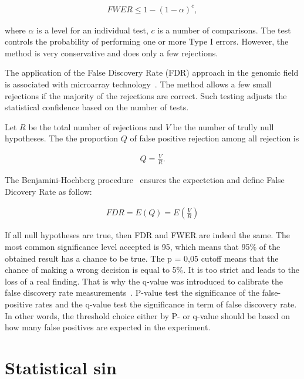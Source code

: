 \begin{align*}
    FWER \leq 1 - (1 - \alpha)^c, 
\end{align*}

where $\alpha$ is a level for an individual test, $c$ is a number of comparisons.
The test controls the probability of performing one or more Type I errors. 
However, the method is very conservative and does only a few rejections. 

The application of the False Discovery Rate (FDR) approach in the genomic field is associated with microarray technology~\cite{lai2017statistical}.
The method allows a few small rejections if the majority of the rejections are correct. Such testing adjusts the statistical confidence based on the number of tests. 

Let $R$ be the total number of rejections and $V$ be the number of trully null hypotheses.
The the proportion $Q$ of false positive rejection among all rejection is 

\begin{align*}
    Q = \frac{V}{R}.
\end{align*}

The Benjamini-Hochberg procedure~\cite{benjamini2000adaptive} ensures the expectetion and define False Dicovery Rate as follow: 

\begin{align*}
    FDR = E(Q) = E \left(\frac{V}{R}\right)
\end{align*}

If all null hypotheses are true, then FDR and FWER are indeed the same.
The most common significance level accepted is 95, which means that 95\% of the obtained result has a chance to be true. 
The p = 0,05 cutoff means that the chance of making a wrong decision is equal to 5\%. 
It is too strict and leads to the loss of a real finding. 
That is why the q-value was introduced to calibrate the false discovery rate measurements~\cite{storey2003statistical}. 
P-value test the significance of the false-positive rates and the q-value test the significance in term of false discovery rate. 
In other words, the threshold choice either by P- or q-value should be based on how many false positives are expected in the experiment.



\section{Statistical sin}

